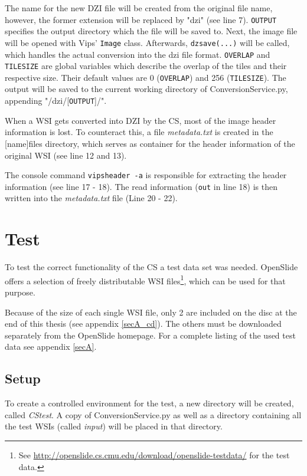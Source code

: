 The name for the new DZI file will be created from the original file name, however, the former extension will be replaced by "dzi" (see line 7). \texttt{OUTPUT} specifies the output directory which the file will be saved to. Next, the image file will be opened with Vips' \texttt{Image} class. Afterwards, \texttt{dzsave(...)} will be called, which handles the actual conversion into the dzi file format. \texttt{OVERLAP} and \texttt{TILESIZE} are global variables which describe the overlap of the tiles and their respective size. Their default values are 0 (\texttt{OVERLAP}) and 256 (\texttt{TILESIZE}). The output will be saved to the current working directory of ConversionService.py, appending "/dzi/[\texttt{OUTPUT}]/".
\clearpage

When a WSI gets converted into DZI by the CS, most of the image header information is lost. To counteract this, a file \emph{metadata.txt} is created in the [name]{\textunderscore}files directory, which serves as container for the header information of the original WSI (see line 12 and 13).

The console command \texttt{vipsheader -a} is responsible for extracting the header information (see line 17 - 18). The read information (\texttt{out} in line 18) is then written into the \emph{metadata.txt} file (Line 20 - 22).


\section{Test}
\label{sec3_test}
To test the correct functionality of the CS a test data set was needed. OpenSlide offers a selection of freely distributable WSI files\footnote{
	See \url{http://openslide.cs.cmu.edu/download/openslide-testdata/} for the test data.
}, which can be used for that purpose.

Because of the size of each single WSI file, only 2 are included on the disc at the end of this thesis (see appendix \ref{secA_cd}). The others must be downloaded separately from the OpenSlide homepage. For a complete listing of the used test data see appendix \ref{secA}.

\subsection{Setup}

To create a controlled environment for the test, a new directory will be created, called \emph{CS{\textunderscore}test}. A copy of ConversionService.py as well as a directory containing all the test WSIs (called \emph{input}) will be placed in that directory.


